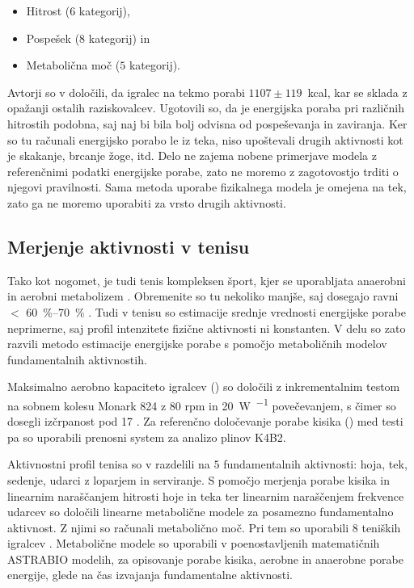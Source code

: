 \begin{itemize}
\item Hitrost ($6$ kategorij),
\item Pospešek ($8$ kategorij) in
\item Metabolična moč ($5$ kategorij).
\end{itemize}

Avtorji so v \cite{osgnach2010energy} določili, da igralec na tekmo porabi $1107 \pm 119$~kcal, kar se sklada z opažanji ostalih raziskovalcev. Ugotovili so, da je energijska poraba pri različnih hitrostih podobna, saj naj bi bila bolj odvisna od pospeševanja in zaviranja. Ker so tu računali energijsko porabo le iz teka, niso upoštevali drugih aktivnosti kot je skakanje, brcanje žoge, itd. Delo ne zajema nobene primerjave modela z referenčnimi podatki energijske porabe, zato ne moremo z zagotovostjo trditi o njegovi pravilnosti. Sama metoda uporabe fizikalnega modela je omejena na tek, zato ga ne moremo uporabiti za vrsto drugih aktivnosti.





\subsection{Merjenje aktivnosti v tenisu}

Tako kot nogomet, je tudi tenis kompleksen šport, kjer se uporabljata anaerobni in aerobni metabolizem \cite{botton2011energy}. Obremenite so tu nekoliko manjše, saj dosegajo ravni $<$ \SI{60}{\%}--\SI{70}{\%} \vomax. Tudi v tenisu so estimacije srednje vrednosti energijske porabe neprimerne, saj profil intenzitete fizične aktivnosti ni konstanten. V delu \cite{botton2011energy} so zato razvili metodo estimacije energijske porabe s pomočjo metaboličnih modelov fundamentalnih aktivnostih. 

Maksimalno aerobno kapaciteto igralcev (\vomax) so določili z inkrementalnim testom na sobnem kolesu Monark 824 z 80 rpm in \SI{20}{W.\min^{-1}} povečevanjem, s čimer so dosegli izčrpanost pod \SI{17}{\min} \cite{botton2011energy}. Za referenčno določevanje porabe kisika (\vo) med testi pa so uporabili prenosni system za analizo plinov K4B2. 

Aktivnostni profil tenisa  so v \cite{botton2011energy} razdelili na $5$ fundamentalnih aktivnosti: hoja, tek, sedenje, udarci z loparjem in serviranje. S pomočjo merjenja porabe kisika in linearnim naraščanjem hitrosti hoje in teka ter linearnim naraščenjem frekvence udarcev so določili linearne metabolične modele za posamezno fundamentalno aktivnost. Z njimi so računali metabolično moč. Pri tem so uporabili $8$ teniških igralcev \cite{botton2011energy}. Metabolične modele so uporabili v poenostavljenih matematičnih ASTRABIO modelih, za opisovanje porabe kisika, aerobne in anaerobne porabe energije, glede na čas izvajanja fundamentalne aktivnosti. 

